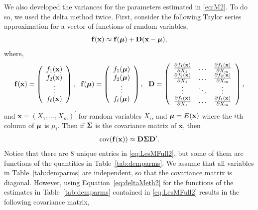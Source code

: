 \documentclass[12pt, titlepage]{article}\usepackage[]{graphicx}\usepackage[]{color}
\newcommand{\bx}{\ensuremath{\mathbf{x}}}
\def\bldf{\mathbf{f}}
\def\bx{\mathbf{x}}
\def\bD{\mathbf{D}}
\def\bmu{\mbox{\boldmath $\mu$}}
\def\bSigma{\mbox{\boldmath $\Sigma$}}
\def\cov{\textrm{cov}}
\def\upp{^{\prime}}
\begin{document}
We also developed the variances for the parameters estimated in \ref{eq:M2}.  To do so, we used the delta method \citep{Dorf:anot:1938,Ver:who:2012} twice.  First, consider the following Taylor series approximation for a vector of functions of random variables,
\begin{equation} \label{eq:deltaMeth1}
  \bldf(\bx) \approx \bldf(\bmu) + \bD (\bx - \bmu),
\end{equation}
where,
\[
\bldf(\bx) = \left(\begin{array}{c}
    f_1(\bx) \\
    f_2(\bx) \\
    \vdots \\
    f_\ell(\bx)
  \end{array}\right), \ \
\bldf(\bmu) = \left(\begin{array}{c}
  f_1(\bmu) \\
  f_2(\bmu) \\
  \vdots \\
  f_\ell(\bmu)
\end{array}\right), \ \
\bD =  \left(\begin{array}{ccc}
  \frac{\partial f_1(\bx)}{\partial X_1} & \ldots & \frac{\partial f_1(\bx)}{\partial X_m} \\
  \frac{\partial f_2(\bx)}{\partial X_1} & \ldots & \frac{\partial f_2(\bx)}{\partial X_m} \\
  \vdots & \ddots & \vdots \\
  \frac{\partial f_\ell(\bx)}{\partial X_1} & \ldots & \frac{\partial f_\ell(\bx)}{\partial X_m}
\end{array}\right),
\]
and $\bx = (X_1,\ldots,X_m)\upp$ for random variables $X_i$, and $\bmu = E(\bx)$ where the $i$th column of $\bmu$ is $\mu_i$.  Then if $\bSigma$ is the covariance matrix of $\bx$, then
\begin{equation} \label{eq:deltaMeth2}
  \cov(\bldf(\bx)) \approx \bD \bSigma \bD\upp.
\end{equation}
Notice that there are 8 unique entries in \ref{eq:LesMFull2}, but some of them are functions of the quantities in Table~\ref{tab:demparms}. We assume that all variables in Table~\ref{tab:demparms} are independent, so that the covariance matrix is diagonal.  However, using Equation~\ref{eq:deltaMeth2} for the functions of the estimates in Table~\ref{tab:demparms} contained in \ref{eq:LesMFull2} results in the following covariance matrix,
\end{document}
